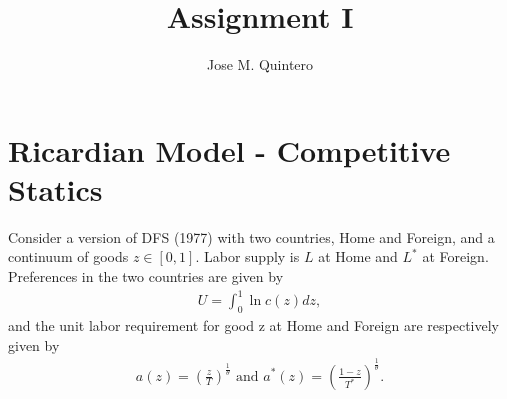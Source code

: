 \documentclass[12pt,oneside,reqno]{amsart}
\title{Assignment I}
\author{Jose M. Quintero}
\begin{document}
\maketitle 

\section{Ricardian Model - Competitive Statics}
Consider a version of DFS (1977) with two countries, Home and Foreign, and a continuum of goods $z \in[0,1]$. Labor supply is $L$ at Home and $L^*$ at Foreign. Preferences in the two countries are given by
    \begin{align*}
    U=\int_0^1 \ln c(z) dz,
    \end{align*}
and the unit labor requirement for good $\mathrm{z}$ at Home and Foreign are respectively given by
    \begin{align*}
    a(z)=\left(\frac{z}{T}\right)^{\frac{1}{\theta}} \text { and } a^*(z)=\left(\frac{1-z}{T^*}\right)^{\frac{1}{\theta}}.
    \end{align*}
\end{document}
